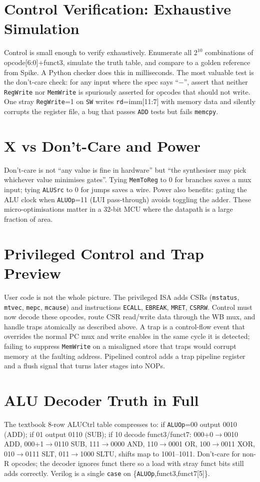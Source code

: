 \section{Control Verification: Exhaustive Simulation}
Control is small enough to verify exhaustively. Enumerate all $2^{10}$ combinations of opcode[6:0]+funct3, simulate the truth table, and compare to a golden reference from Spike. A Python checker does this in milliseconds. The most valuable test is the don't-care check: for any input where the spec says ``$-$'', assert that neither \texttt{RegWrite} nor \texttt{MemWrite} is spuriously asserted for opcodes that should not write. One stray \texttt{RegWrite}=1 on \texttt{SW} writes \texttt{rd}=imm[11:7] with memory data and silently corrupts the register file, a bug that passes \texttt{ADD} tests but fails \texttt{memcpy}.

\section{X vs Don't-Care and Power}
Don't-care is not ``any value is fine in hardware'' but ``the synthesiser may pick whichever value minimises gates''. Tying \texttt{MemToReg} to 0 for branches saves a mux input; tying \texttt{ALUSrc} to 0 for jumps saves a wire. Power also benefits: gating the ALU clock when \texttt{ALUOp}=11 (LUI pass-through) avoids toggling the adder. These micro-optimisations matter in a 32-bit MCU where the datapath is a large fraction of area.

\section{Privileged Control and Trap Preview}
User code is not the whole picture. The privileged ISA adds CSRs (\texttt{mstatus}, \texttt{mtvec}, \texttt{mepc}, \texttt{mcause}) and instructions \texttt{ECALL}, \texttt{EBREAK}, \texttt{MRET}, \texttt{CSRRW}. Control must now decode these opcodes, route CSR read/write data through the WB mux, and handle traps atomically as described above. A trap is a control-flow event that overrides the normal PC mux and write enables in the same cycle it is detected; failing to suppress \texttt{MemWrite} on a misaligned store that traps would corrupt memory at the faulting address. Pipelined control adds a trap pipeline register and a flush signal that turns later stages into NOPs.


\section{ALU Decoder Truth in Full}
The textbook 8-row ALUCtrl table compresses to: if \texttt{ALUOp}=00 output 0010 (ADD); if 01 output 0110 (SUB); if 10 decode funct3/funct7: 000+0$\to$0010 ADD, 000+1$\to$0110 SUB, 111$\to$0000 AND, 110$\to$0001 OR, 100$\to$0011 XOR, 010$\to$0111 SLT, 011$\to$1000 SLTU, shifts map to 1001--1011. Don't-care for non-R opcodes; the decoder ignores funct there so a load with stray funct bits still adds correctly. Verilog is a single \texttt{case} on \{\texttt{ALUOp},funct3,funct7[5]\}.

